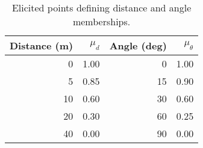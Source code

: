\begin{table}[H]
\centering
\caption{Elicited points defining distance and angle memberships.}
\label{tab:fig6-points}
\begin{tabular}{rrrr}
\hline
Distance (m) & $\mu_d$ & Angle (deg) & $\mu_\theta$ \\
\hline
0 & 1.00 & 0 & 1.00 \\
5 & 0.85 & 15 & 0.90 \\
10 & 0.60 & 30 & 0.60 \\
20 & 0.30 & 60 & 0.25 \\
40 & 0.00 & 90 & 0.00 \\
\hline
\end{tabular}
\end{table}
